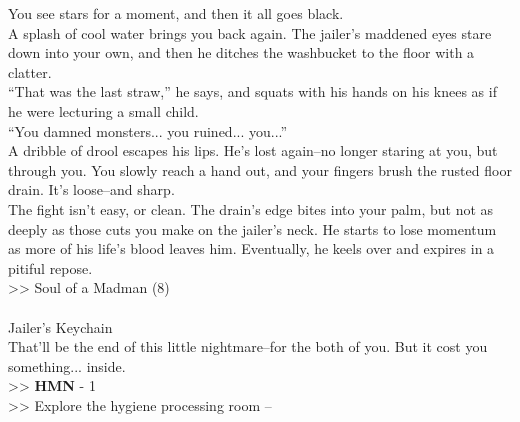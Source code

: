You see stars for a moment, and then it all goes black.\\

A splash of cool water brings you back again. The jailer’s maddened eyes stare down into your own, and then he ditches the washbucket to the floor with a clatter.\\
“That was the last straw,” he says, and squats with his hands on his knees as if he were lecturing a small child.\\

“You damned monsters... you ruined... you...”\\
A dribble of drool escapes his lips. He’s lost again--no longer staring at you, but through you. You slowly reach a hand out, and your fingers brush the rusted floor drain. It’s loose--and sharp.\\

The fight isn’t easy, or clean. The drain’s edge bites into your palm, but not as deeply as those cuts you make on the jailer's neck. He starts to lose momentum as more of his life’s blood leaves him. Eventually, he keels over and expires in a pitiful repose.\\
>> Soul of a Madman (8)\\
\\
 Jailer’s Keychain\\

That’ll be the end of this little nightmare--for the both of you. But it cost you something... inside.\\

>> \textbf{HMN} - 1\\
>> Explore the hygiene processing room -- 